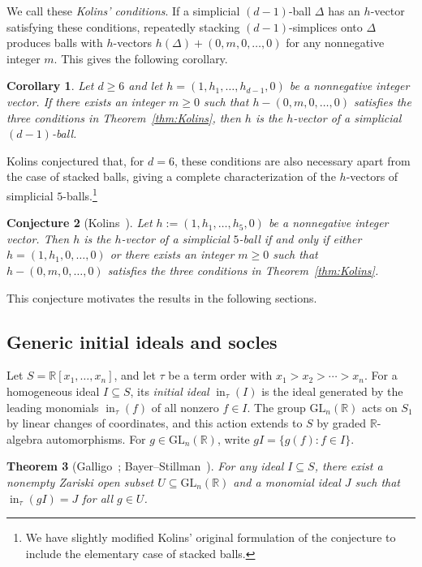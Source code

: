 \documentclass[11pt]{article}
\newtheorem{theorem}{Theorem}[section]
\newtheorem{corollary}[theorem]{Corollary}
\newtheorem{conjecture}[theorem]{Conjecture}
\theoremstyle{definition}
\numberwithin{equation}{theorem}
\newcommand{\kk}{{\mathbb R}}
\begin{document}
We call these \emph{Kolins' conditions}. If a simplicial $(d-1)$-ball $\Delta$ has an $h$-vector satisfying these conditions, repeatedly stacking $(d-1)$-simplices onto $\Delta$ produces balls with $h$-vectors $h(\Delta)+(0,m,0,\ldots,0)$ for any nonnegative integer $m$. This gives the following corollary.


\begin{corollary}
\label{cor:Kolins}
Let $d\geq 6$ and let $h=(1,h_1,\ldots,h_{d-1},0)$ be a nonnegative integer vector. If there exists an integer $m\ge 0$ such that $h-(0,m,0,\ldots,0)$ satisfies the three conditions in Theorem~\ref{thm:Kolins}, then $h$ is the $h$-vector of a simplicial $(d-1)$-ball.
\end{corollary}

Kolins conjectured that, for $d=6$, these conditions are also necessary apart from the case of stacked balls, giving a complete characterization of the $h$-vectors of simplicial $5$-balls.\footnote{We have slightly modified Kolins’ original formulation of the conjecture to include the elementary case of stacked balls.}

\begin{conjecture}[{Kolins~\cite[Conjecture 18]{Kolins2011}}]  \label{conj:Kolins}
     Let $h := (1, h_1,\ldots, h_5, 0)$ be a nonnegative integer vector. Then $h$ is the $h$-vector of a simplicial $5$-ball if and only if either $h = (1, h_1, 0, \ldots, 0)$ or there exists an integer $m \geq 0$ such that $h - (0,m,0,\ldots,0)$ satisfies the three conditions in Theorem~\ref{thm:Kolins}.
\end{conjecture}
\noindent This conjecture motivates the results in the following sections.




\subsection{Generic initial ideals and socles} \label{sec:gin}

Let $S=\kk[x_1,\dots,x_n]$, and let $\tau$ be a term order with $x_1> x_2>\cdots>x_n$. For a homogeneous ideal $I\subseteq S$, its \emph{initial ideal} $\operatorname{in}_\tau(I)$ is the ideal generated by the leading monomials $\operatorname{in}_\tau(f)$ of all nonzero $f\in I$. The group $\mathrm{GL}_n(\kk)$ acts on $S_1$ by linear changes of coordinates, and this action extends to $S$ by graded $\kk$-algebra automorphisms. For $g\in\mathrm{GL}_n(\kk)$, write $gI=\{g(f):f\in I\}$.


\begin{theorem}[Galligo~\cite{Galligo1974}; Bayer--Stillman~\cite{BayerStillman1987}]\label{thm:gin-exists}
For any ideal $I\subseteq S$, there exist a nonempty Zariski open subset $U\subseteq\mathrm{GL}_n(\kk)$ and a monomial ideal $J$ such that $\operatorname{in}_\tau(gI)=J$ for all $g\in U$.
\end{theorem}
\end{document}

